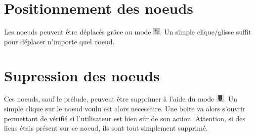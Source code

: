 	\section{Positionnement des noeuds}
		Les noeuds peuvent être déplacés grâce au mode \includegraphics[height=10pt]{img/modeSelected.png}. Un simple clique/glisse suffit pour déplacer n'importe quel noeud.

	\section{Supression des noeuds}
		Ces noeuds, sauf le prélude, peuveut être supprimer à l'aide du mode \includegraphics[height=0.4cm]{img/modeSupression.png}. Un simple clique sur le noeud voulu est alors necessaire. Une boite va alors s'ouvrir permettant de vérifié si l'utilisateur est bien sûr de son action. Attention, si des liens étais présent sur ce noeud, ils sont tout simplement supprimé.
